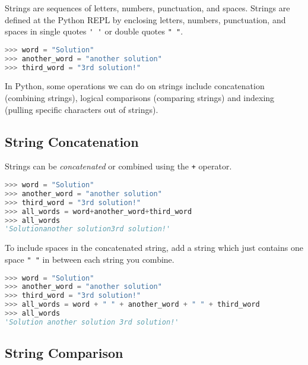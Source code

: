 \documentclass{book}
\newcommand{\passthrough}[1]{#1}
\begin{document}
    
        Strings are sequences of letters, numbers, punctuation, and spaces.
Strings are defined at the Python REPL by enclosing letters, numbers,
punctuation, and spaces in single quotes \passthrough{\lstinline!' '!}
or double quotes \passthrough{\lstinline!" "!}.

\begin{lstlisting}[language=Python]
>>> word = "Solution"
>>> another_word = "another solution"
>>> third_word = "3rd solution!"
\end{lstlisting}

In Python, some operations we can do on strings include concatenation
(combining strings), logical comparisons (comparing strings) and
indexing (pulling specific characters out of strings).
    




    
        \hypertarget{string-concatenation}{%
\subsection{String Concatenation}\label{string-concatenation}}
    




    
        Strings can be \emph{concatenated} or combined using the
\passthrough{\lstinline!+!} operator.

\begin{lstlisting}[language=Python]
>>> word = "Solution"
>>> another_word = "another solution"
>>> third_word = "3rd solution!"
>>> all_words = word+another_word+third_word
>>> all_words
'Solutionanother solution3rd solution!'
\end{lstlisting}

To include spaces in the concatenated string, add a string which just
contains one space \passthrough{\lstinline!" "!} in between each string
you combine.

\begin{lstlisting}[language=Python]
>>> word = "Solution"
>>> another_word = "another solution"
>>> third_word = "3rd solution!"
>>> all_words = word + " " + another_word + " " + third_word
>>> all_words
'Solution another solution 3rd solution!'
\end{lstlisting}
    




    
        \hypertarget{string-comparison}{%
\subsection{String Comparison}\label{string-comparison}}
    
\end{document}

